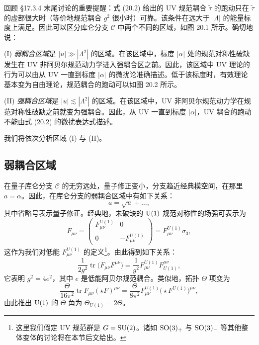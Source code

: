 回顾 §17.3.4 末尾讨论的重要提醒：式 (20.2) 给出的 UV 规范耦合 $\tilde\tau$ 的跑动只在 $\tilde\tau$ 的虚部很大时（等价地规范耦合 $g^2$ 很小时）可靠。该条件在远大于 $|\Lambda|$ 的能量标度上满足。因此可以区分库仑分支 $\mathcal{C}$ 中两个不同的区域，如图 20.1 所示。确切地说：


(I) \emph{弱耦合区域}是 $|u|\gg|\Lambda^2|$ 的区域。在该区域中，标度 $|\alpha|$ 处的规范对称性破缺发生在 UV 非阿贝尔规范动力学进入强耦合区之前。因此，该区域中 UV 理论的行为可以由从 UV 一直到标度 $|\alpha|$ 的微扰论准确描述。低于该标度时，有效理论基本变为自由理论，规范耦合的跑动可以如图 20.2 所示。


(II) \emph{强耦合区域}是 $|u|\lesssim|\Lambda^2|$ 的区域。在该区域中，UV 非阿贝尔规范动力学在规范对称性破缺之前就变为强耦合。因此，从 UV 一直到标度 $|\alpha|$，UV 耦合的跑动不能由式 (20.2) 的微扰表达式描述。

我们将依次分析区域 (I) 与 (II)。

\subsection{弱耦合区域}

在量子库仑分支 $\mathcal{C}$ 的无穷远处，量子修正变小，分支趋近经典模空间，在那里 $a=\alpha$。因此，在库仑分支的弱耦合区域中有如下关系：
\[
a=\sqrt{u}+\dots,
\]
其中省略号表示量子修正。经典地，未破缺的 $\operatorname{U}(1)$ 规范对称性的场强可表示为
\[
F_{\mu\nu}=\begin{pmatrix}F^{U(1)}_{\mu\nu}&0\\0&-F^{U(1)}_{\mu\nu}\end{pmatrix}=F^{U(1)}_{\mu\nu}\sigma_3,
\]
这作为我们对低能 $F^{U(1)}_{\mu\nu}$ 的定义\footnote{这里我们假定 UV 规范群是 $G=\operatorname{SU}(2)$。诸如 $\operatorname{SO}(3)_+$ 与 $\operatorname{SO}(3)_-$ 等其他整体变体的讨论将在本节后文给出。}。由此得到如下关系：
\[
\frac{1}{2g^2}\operatorname{tr}\bigl(F_{\mu\nu}F^{\mu\nu}\bigr)=\frac{1}{g^2}F^{U(1)}_{\mu\nu}F^{\mu\nu}_{U(1)},
\]
它表明 $g^2=4e^2$，其中 $e$ 是低能阿贝尔规范耦合。类似地，拓扑 $\Theta$ 项变为
\[
\frac{\Theta}{16\pi^2}\operatorname{tr}F_{\mu\nu}(\star F)^{\mu\nu}=\frac{\Theta}{8\pi^2}F^{U(1)}_{\mu\nu}\bigl(\star F^{U(1)}\bigr)^{\mu\nu},
\]
由此推出 $\operatorname{U}(1)$ 的 $\Theta$ 角为 $\Theta_{U(1)}=2\Theta$。

